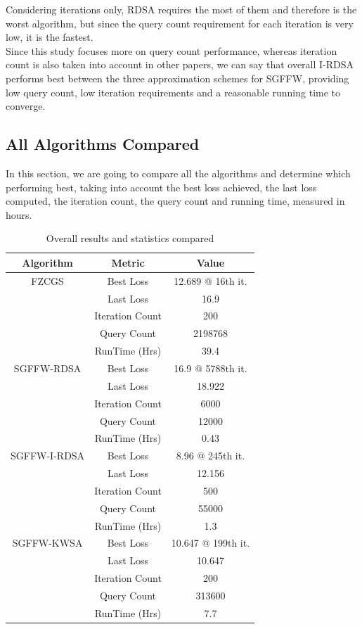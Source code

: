 \documentclass[10pt,twocolumn,letterpaper]{article}
\begin{document}
Considering iterations only, RDSA requires the most of them and therefore is the worst algorithm, 
but since the query count requirement for each iteration is very low, it is the fastest. \\

Since this study focuses more on query count performance, whereas iteration count is also taken into account
in other papers, we can say that overall I-RDSA performs best between the three approximation schemes for SGFFW,
providing low query count, low iteration requirements and a reasonable running time to converge.


\subsection{All Algorithms Compared}

In this section, we are going to compare all the algorithms and determine which performing best,
taking into account the best loss achieved, the last loss computed, 
the iteration count, the query count and running time, measured in hours.

\begin{table}[h]
   \centering
   \begin{tabular}{ccc}
       \hline
       Algorithm & Metric & Value \\
       \hline
       FZCGS & Best Loss & 12.689 @ 16th it.\\
            & Last Loss & 16.9\\
            & Iteration Count & 200\\
            & Query Count & 2198768\\
            & RunTime (Hrs) & 39.4\\
       \hline
       SGFFW-RDSA & Best Loss & 16.9 @ 5788th it.\\
                  & Last Loss & 18.922\\
                  & Iteration Count & 6000\\
                  & Query Count & 12000\\
                  & RunTime (Hrs) & 0.43\\
       \hline
       SGFFW-I-RDSA & Best Loss & 8.96 @ 245th it.\\
                    & Last Loss & 12.156\\
                    & Iteration Count & 500\\
                    & Query Count & 55000\\
                    & RunTime (Hrs) & 1.3\\
       \hline
       SGFFW-KWSA & Best Loss & 10.647 @ 199th it.\\
                  & Last Loss & 10.647\\
                  & Iteration Count & 200\\
                  & Query Count & 313600\\
                  & RunTime (Hrs) & 7.7\\
       \hline
   \end{tabular}
   \
   \caption{Overall results and statistics compared} 
   \label{tab:overall_results}
\end{table}
\end{document}
